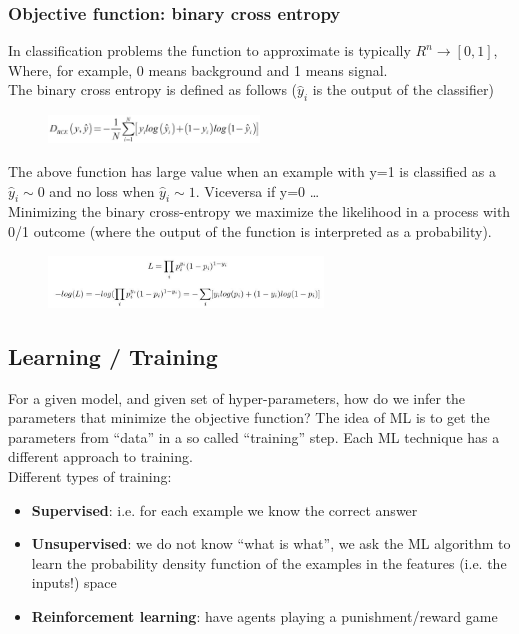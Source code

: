 \subsubsection{Objective function: binary cross entropy}
In classification problems the function to approximate is typically $R^n \rightarrow [0,1]$, Where, for example, 0 means background and 1 means signal.\\
The binary cross entropy is defined as follows ($\hat{y}_i$ is the output of the classifier)
 
\begin{figure}[h]
	\centering
	\includegraphics[width=0.5\textwidth]{figure_ml/D_bce.png}
\end{figure}
\FloatBarrier
The above function has large value when an example with y=1 is classified as 
a  $\hat{y}_i \sim 0$ and no loss when $\hat{y}_i \sim 1$. Viceversa if y=0 …\\
Minimizing the binary cross-entropy we maximize the likelihood in a process with 0/1 outcome (where the output of the function is interpreted as a probability).
 
\begin{figure}[h]
	\centering
	\includegraphics[width=0.65\textwidth]{figure_ml/L_bce.png}
\end{figure}
\FloatBarrier

\subsection{Learning / Training}
For a given model, and given set of hyper-parameters, how do we infer the parameters that minimize the objective function? The idea of ML is to get the parameters from “data” in a so called “training” step. Each ML technique has a different approach to training.\\
Different types of training:
\begin{itemize}
	\item \textbf{Supervised}: i.e. for each example we know the correct answer
	\item \textbf{Unsupervised}: we do not know “what is what”, we ask the ML algorithm to learn the probability density function of the examples in the features (i.e. the inputs!) space
	\item \textbf{Reinforcement learning}: have agents playing a punishment/reward game
\end{itemize}

